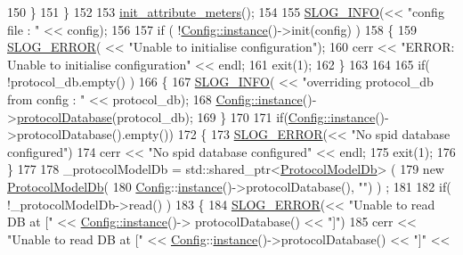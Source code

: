 \begin{DoxyCode}
150         \}
151     \}
152 
153     \hyperlink{_attribute_meter_registrar_8h_acc628170f0b90d7876378e03d3159647}{init\_attribute\_meters}();
154 
155     \hyperlink{_logger_8h_a119c1c29ba35a8db38e2358e41167282}{SLOG\_INFO}(<< \textcolor{stringliteral}{"config file : "} << config);
156 
157     \textcolor{keywordflow}{if} ( !\hyperlink{class_vsid_netfilter_1_1_config_abf1d4539011ef83cac0fef2ac864a3a9}{Config::instance}()->init(config) )
158     \{
159         \hyperlink{_logger_8h_a2a8694cd392d18f4db6b9cc9f15bafe3}{SLOG\_ERROR}( << \textcolor{stringliteral}{"Unable to initialise configuration"});
160         cerr << \textcolor{stringliteral}{"ERROR: Unable to initialise configuration"} << endl;
161         exit(1);
162     \}
163 
164     
165     \textcolor{keywordflow}{if}( !protocol\_db.empty() )
166     \{
167         \hyperlink{_logger_8h_a119c1c29ba35a8db38e2358e41167282}{SLOG\_INFO}( << \textcolor{stringliteral}{"overriding protocol\_db from config : "} << protocol\_db); 
168         \hyperlink{class_vsid_netfilter_1_1_config_abf1d4539011ef83cac0fef2ac864a3a9}{Config::instance}()->\hyperlink{class_vsid_netfilter_1_1_config_ae34621f4ec48a1f8354f006b150098ab}{protocolDatabase}(protocol\_db);
169     \}
170 
171     \textcolor{keywordflow}{if}(\hyperlink{class_vsid_netfilter_1_1_config_abf1d4539011ef83cac0fef2ac864a3a9}{Config::instance}()->protocolDatabase().empty())
172     \{
173         \hyperlink{_logger_8h_a2a8694cd392d18f4db6b9cc9f15bafe3}{SLOG\_ERROR}(<< \textcolor{stringliteral}{"No spid database configured"})
174         cerr << "No spid database configured" << endl;
175         exit(1);
176     \}
177 
178     \_protocolModelDb = std::shared\_ptr<\hyperlink{class_vsid_1_1_protocol_model_db}{ProtocolModelDb}> ( 
179                                             new \hyperlink{class_vsid_1_1_protocol_model_db}{ProtocolModelDb}(
180                                                 \hyperlink{class_vsid_netfilter_1_1_config}{Config}::\hyperlink{class_vsid_netfilter_1_1_process_a56a4c6294170fa3abf87a7a214ff4cea}{instance}()->protocolDatabase(), "") )
      ;
181     
182     if( !\_protocolModelDb->read() )
183     \{
184         \hyperlink{_logger_8h_a2a8694cd392d18f4db6b9cc9f15bafe3}{SLOG\_ERROR}(<< \textcolor{stringliteral}{"Unable to read DB at ["} << \hyperlink{class_vsid_netfilter_1_1_config_abf1d4539011ef83cac0fef2ac864a3a9}{Config::instance}()->
      protocolDatabase() << \textcolor{stringliteral}{"]"})
185         cerr << "Unable to read DB at [" << \hyperlink{class_vsid_netfilter_1_1_config}{Config}::\hyperlink{class_vsid_netfilter_1_1_process_a56a4c6294170fa3abf87a7a214ff4cea}{instance}()->protocolDatabase() << "]" << 

\end{DoxyCode}
